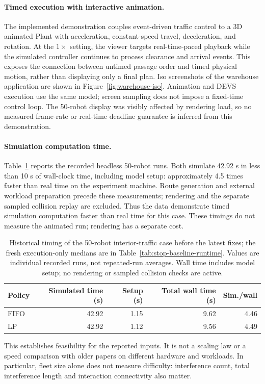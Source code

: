 \documentclass[11pt,a4paper]{article}
\theoremstyle{remark}
\begin{document}
\paragraph{Timed execution with interactive animation.}
The implemented demonstration couples event-driven traffic control to a
3D animated Plant with acceleration, constant-speed travel, deceleration,
and rotation. At the $1\times$ setting, the viewer targets real-time-paced
playback while the simulated controller continues to process clearance and
arrival events. This exposes the connection between untimed passage order
and timed physical motion, rather than displaying only a final plan.
Iso screenshots of the warehouse application are shown in
Figure~\ref{fig:warehouse-iso}. Animation and DEVS execution use the same
model; screen sampling does not impose a fixed-time control loop.
The 50-robot display was visibly affected by rendering load, so no measured
frame-rate or real-time deadline guarantee is inferred from this demonstration.

\paragraph{Simulation computation time.}
Table~\ref{tab:realtime-evidence} reports the recorded headless 50-robot
runs. Both simulate 42.92 s in less than 10 s of wall-clock time, including
model setup: approximately 4.5 times faster than real time on the experiment
machine. Route generation and external workload preparation precede these
measurements; rendering and the separate sampled collision replay are
excluded. Thus the data demonstrate timed simulation computation faster than real time
for this case. These timings do not measure the animated run; rendering has
a separate cost.

\begin{table}[htbp]
\centering\small
\caption{Historical timing of the 50-robot interior-traffic case before the latest fixes; the fresh execution-only medians are in Table~\ref{tab:stop-baseline-runtime}.
Values are individual recorded runs, not repeated-run averages. Wall time
includes model setup; no rendering or sampled collision checks are active.}
\label{tab:realtime-evidence}
\begin{tabular}{lrrrr}
\toprule
Policy & Simulated time (s) & Setup (s) & Total wall time (s) & Sim./wall\\
\midrule
FIFO & 42.92 & 1.15 & 9.62 & 4.46\\
LP   & 42.92 & 1.12 & 9.56 & 4.49\\
\bottomrule
\end{tabular}
\end{table}
This establishes feasibility for the reported inputs. It is not a scaling
law or a speed comparison with older papers on different hardware and
workloads. In particular, fleet size alone does not measure difficulty:
interference count, total interference length and interaction connectivity
also matter.
\end{document}
